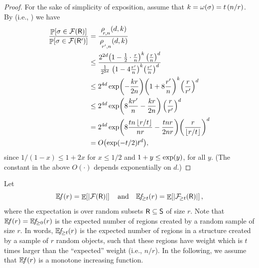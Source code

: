 \begin{proof}
    For the sake of simplicity of exposition, assume that
    $k = \WeightX[]{\Trap} = t\,(n/r)$.  By 
    (i.e., ) we have
    \begin{align*}
      \frac{\Prob{\Trap \in \RegionsSet{\Sample}}}{ \Prob{\Trap \in
      \RegionsSet{\SampleA}}}%
      &=%
        \frac{\CSProbFull{r}{d}{k}{n}} {\CSProbFull{r'}{d}{k}{n}}
      \\&%
          \leq \frac{2^{2d}\pth{ 1 - \frac{1}{2} \cdot \frac{r}{n} }^{k}
          \,\pth{\frac{r}{n}}^d}{%
          \frac{1}{2^{2d}} \; \pth{ 1 - 4 \frac{ r'}{n} }^{k}
          \pth{\frac{r'}{n}}^d}
      \\&%
          \leq%
          2^{4d}\exp \pth{ - \frac{kr}{2n} } \pth{ 1 + 8 \frac{
          r'}{n} }^{k} \pth{\frac{r}{r'}}^d%
      \\&%
      \leq 2^{4d}\exp
      \pth{ 8 \frac{ kr'}{n}- \frac{kr}{2n} }
      \,\pth{\frac{r}{r'}}^d
      \\&
      = 2^{4d}\exp \pth{ 8 \frac{ tn \floor{r/t}}{nr}-
      \frac{tnr}{2nr} } \pth{\frac{r}{\floor{r/t}}}^d
      \\&
      = O
      \pth{ \exp\pth{-t/2} t^d },
    \end{align*}
    since $1/(1-x) \leq 1+2x$ for $x \leq 1 /2$ and $1+y \leq \exp
    \pth{y}$, for all $y$. (The constant in the above $O(\cdot)$
    depends exponentially on $d$.)
\end{proof}

Let
\begin{equation*}
    \NumOfRegionsZero{r} = \Ex{
       \cardin{\MakesBig\RegionsSet{\Sample}}}%
    \quad \text{and}\quad%
    \NumOfRegions{t}{r} = \Ex{
       \cardin{\RegionsHeavy{t}{\Sample}}},
\end{equation*}
where the expectation is over random subsets $\mathsf{R} \subseteq
\mathsf{S}$ of size $r$. Note that $\NumOfRegionsZero{r} =
\NumOfRegions{0}{r}$ is the expected number of regions created by a
random sample of size $r$. In words, $\NumOfRegions{t}{r}$ is the
expected number of regions in a structure created by a sample of $r$
random objects, such that these regions have weight which is $t$ times
larger than the ``expected'' weight (i.e., $n/r$).  In the following,
we assume that $\NumOfRegionsZero{r}$ is a monotone increasing
function.

